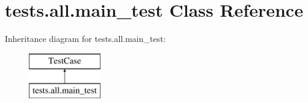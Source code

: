 \hypertarget{classtests_1_1all_1_1main__test}{\section{tests.\-all.\-main\-\_\-test Class Reference}
\label{classtests_1_1all_1_1main__test}
}
Inheritance diagram for tests.\-all.\-main\-\_\-test\-:\begin{figure}[H]
\begin{center}
\leavevmode
\includegraphics[height=2.000000cm]{classtests_1_1all_1_1main__test}
\end{center}
\end{figure}
